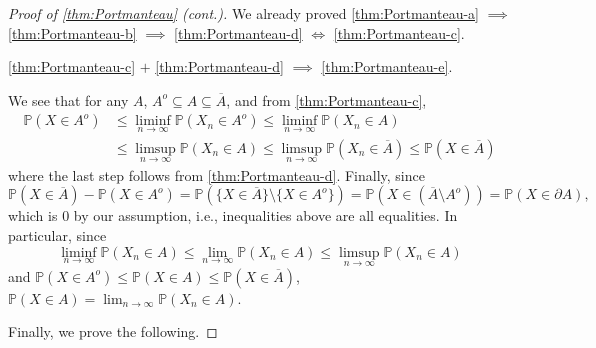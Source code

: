 \begin{proof}[Proof of \autoref{thm:Portmanteau} (cont.)]\label{pf:thm:Portmanteau-cont}
	We already proved \autoref{thm:Portmanteau-a} \(\implies \) \autoref{thm:Portmanteau-b} \(\implies \) \autoref{thm:Portmanteau-d} \(\iff \) \autoref{thm:Portmanteau-c}.

	\begin{claim}
		\autoref{thm:Portmanteau-c} \(+\) \autoref{thm:Portmanteau-d} \(\implies \) \autoref{thm:Portmanteau-e}.
	\end{claim}
	\begin{explanation}
		We see that for any \(A\), \(A^o \subseteq A \subseteq \overline{A} \), and from  \autoref{thm:Portmanteau-c},
		\[
			\begin{split}
				\mathbb{P} (X \in A^o)
				 & \leq \liminf_{n \to \infty} \mathbb{P} (X_n \in A^o)
				\leq \liminf_{n \to \infty} \mathbb{P} (X_n \in A)      \\
				 & \leq \limsup_{n \to \infty} \mathbb{P} (X_n \in A)
				\leq \limsup_{n \to \infty} \mathbb{P} (X_n \in \overline{A} )
				\leq \mathbb{P} (X \in \overline{A} )
			\end{split}
		\]
		where the last step follows from \autoref{thm:Portmanteau-d}. Finally, since
		\[
			\mathbb{P} (X \in \overline{A} ) - \mathbb{P} (X \in A^o)
			= \mathbb{P} ( \{ X \in \overline{A} \} \setminus \{ X \in A^o \} )
			= \mathbb{P} (X \in (\overline{A} \setminus A^o))
			= \mathbb{P} (X \in \partial A),
		\]
		which is \(0\) by our assumption, i.e., inequalities above are all equalities. In particular, since
		\[
			\liminf_{n \to \infty} \mathbb{P} (X_n \in A)
			\leq \lim_{n \to \infty} \mathbb{P} (X_n \in A)
			\leq \limsup_{n \to \infty} \mathbb{P} (X_n \in A)
		\]
		and \(\mathbb{P} (X \in A^o) \leq \mathbb{P} (X \in A) \leq \mathbb{P} (X \in \overline{A} ) \), \(\mathbb{P} (X \in A) = \lim_{n \to \infty} \mathbb{P} (X_n \in A)\).
	\end{explanation}

	Finally, we prove the following.


\end{proof}
